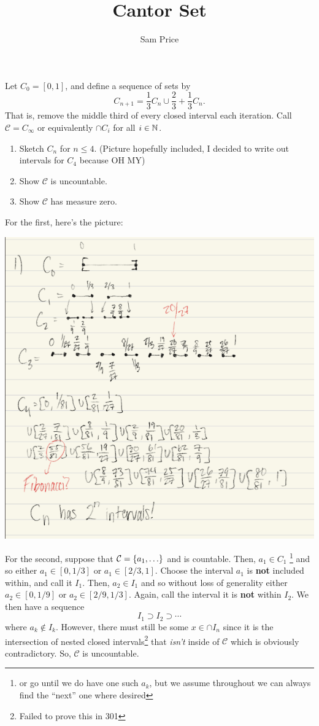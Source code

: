 \documentclass{article}
\author{Sam Price}
\title{Cantor Set}
\newcommand{\CA}{\mathcal{C}}
\begin{document}
\maketitle

Let $C_{0} = [0, 1]$, and define a sequence of sets by
\[ C_{n + 1} = \frac{1}{3}C_{n} \cup \frac{2}{3} + \frac{1}{3}C_{n}. \]
That is, remove the middle third of every closed interval each iteration.
Call $\CA = C_{\infty}$ or equivalently $\cap C_{i}$ for all $i \in \mathbb{N}^{}$.

\begin{enumerate}[start=1,label={\arabic*\rparen}]
  \item Sketch $C_{n}$ for $n \le 4$. (Picture hopefully included, I decided to write out intervals for $C_{4}$ because OH MY)
  \item Show $\CA$ is uncountable.
  \item Show $\CA$ has measure zero.
\end{enumerate}

For the first, here's the picture:

\includegraphics[width=\textwidth/2]{cantor}

For the second, suppose that $\CA = \set{ a_{1}, \ldots }$ and is countable.
Then, $a_{1} \in C_{1}$
\footnote{or go until we do have one such $a_{k}$, but we assume throughout we can always find the ``next'' one where desired}
and so either $a_{1} \in [0, 1/3]$ or $a_{1} \in [2/3, 1]$.
Choose the interval $a_{1}$ is \textbf{not} included within, and call it $I_{1}$.
Then, $a_{2} \in I_{1}$ and so without loss of generality
either $a_{2} \in [0,1/9]$ or $a_{2} \in [2/9, 1/3]$.
Again, call the interval it is \textbf{not} within $I_{2}$.
We then have a sequence
\[ I_{1} \supset I_{2} \supset \cdots \]
where $a_{k} \notin I_{k}$.
However, there must still be some $x \in \cap I_{n}$ since it is the intersection of nested closed
intervals\footnote{Failed to prove this in 301} that \emph{isn't} inside of $\CA$ which is
obviously contradictory. So, $\CA$ is uncountable.
\end{document}
